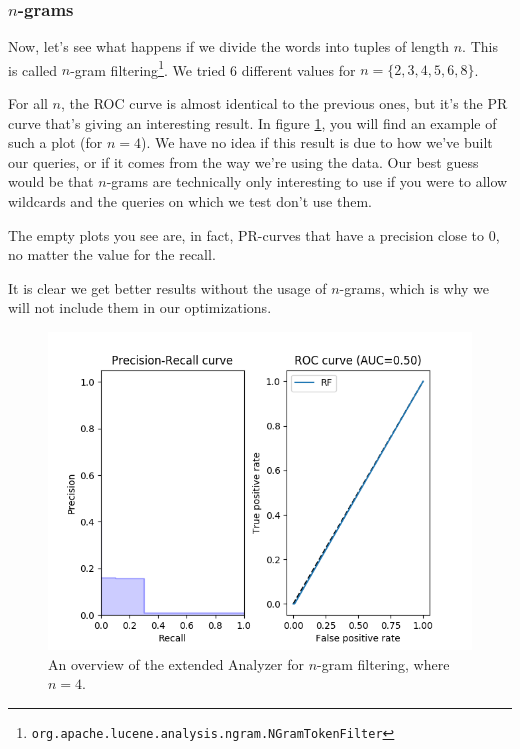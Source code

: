 \documentclass[11pt]{article}
\begin{document}
\subsubsection{$n$-grams}\label{sec:ngrams}
Now, let's see what happens if we divide the words into tuples of length $n$. This is called $n$-gram filtering\footnote{\texttt{org.apache.lucene.analysis.ngram.NGramTokenFilter}}. We tried 6 different values for $n = \{2, 3, 4, 5, 6, 8\}$.

For all $n$, the ROC curve is almost identical to the previous ones, but it's the PR curve that's giving an interesting result. In figure \ref{fig:ngram4}, you will find an example of such a plot (for $n = 4$). We have no idea if this result is due to how we've built our queries, or if it comes from the way we're using the data. Our best guess would be that $n$-grams are technically only interesting to use if you were to allow wildcards and the queries on which we test don't use them.

The empty plots you see are, in fact, PR-curves that have a precision close to 0, no matter the value for the recall.

It is clear we get better results without the usage of $n$-grams, which is why we will not include them in our optimizations.

\begin{figure}[htp]
    \centering
    \includegraphics[width=\textwidth]{images/customAna-n4}
    \caption{An overview of the extended Analyzer for $n$-gram filtering, where $n = 4$.}
    \label{fig:ngram4}
\end{figure}
\end{document}
